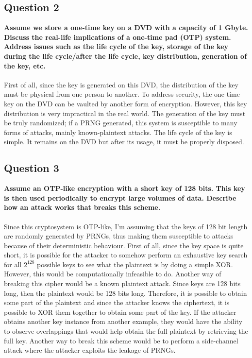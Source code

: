 \documentclass[titlepage]{article}
\begin{document}
{\subsection{Question 2}
{
\textbf{Assume we store a one-time key on a DVD with a capacity of 1 Gbyte. Discuss the real-life implications of a one-time pad (OTP) system. Address issues such as the life cycle of the key, storage of the key during the life cycle/after the life cycle, key distribution, generation of the key, etc.}\\\\
First of all, since the key is generated on this DVD, the distribution of the key must be physical from one person to another. To address security, the one time key on the DVD can be vaulted by another form of encryption. However, this key distribution is very impractical in the real world. The generation of the key must be truly randomized; if a PRNG generated, this system is susceptible to many forms of attacks, mainly known-plaintext attacks. The life cycle of the key is simple. It remains on the DVD but after its usage, it must be properly disposed. 
}
\clearpage
\subsection{Question 3}
{
\textbf{Assume an OTP-like encryption with a short key of 128 bits. This key is then used periodically to encrypt large volumes of data. Describe how an attack works that breaks this scheme.}\\\\
Since this cryptosystem is OTP-like, I'm assuming that the keys of 128 bit length are randomly generated by PRNGs, thus making them susceptible to attacks because of their deterministic behaviour. First of all, since the key space is quite short, it is possible for the attacker to somehow perform an exhaustive key search for all \(2^{128}\) possible keys to see what the plaintext is by doing a simple XOR. However, this would be computationally infeasible to do. Another way of breaking this cipher would be a known plaintext attack. Since keys are 128 bits long, then the plaintext would be 128 bits long. Therefore, it is possible to obtain some part of the plaintext and since the attacker knows the ciphertext, it is possible to XOR them together to obtain some part of the key. If the attacker obtains another key instance from another example, they would have the ability to observe overlappings that would help obtain the full plaintext by retrieving the full key. Another way to break this scheme would be to perform a side-channel attack where the attacker exploits the leakage of PRNGs.
}
}
\end{document}
